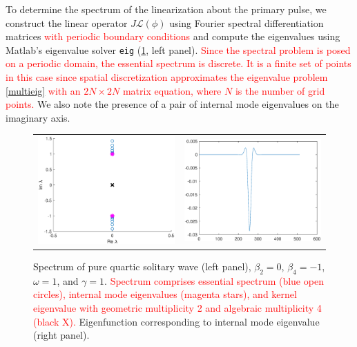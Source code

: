 \documentclass[12pt]{elsarticle}
\def\calL{{\mathcal L}}
\newcommand{\revised}[1]{ \textcolor{red}{#1} }
\begin{document}
To determine the spectrum of the linearization about the primary pulse, we construct the linear operator $J \calL(\phi)$ using Fourier spectral differentiation matrices \revised{with periodic boundary conditions} and compute the eigenvalues using Matlab's eigenvalue solver \texttt{eig} (\cref{fig:PQSspec}, left panel). \revised{Since the spectral problem is posed on a periodic domain, the essential spectrum is discrete. It is a finite set of points in this case since spatial discretization approximates the eigenvalue problem \cref{multieig} with an $2N \times 2N$ matrix equation, where $N$ is the number of grid points.} We also note the presence of a pair of internal mode eigenvalues on the imaginary axis.  

\begin{figure}[H]
\centering
\begin{tabular}{cc}
\includegraphics[width=8cm]{images/PQSspec.eps} &
\includegraphics[width=8cm]{images/PQSinternalmode.eps}
\end{tabular}
\caption{Spectrum of pure quartic solitary wave (left panel), $\beta_2 = 0$, $\beta_4 = -1$, $\omega = 1$, and $\gamma = 1$. \revised{Spectrum comprises essential spectrum (blue open circles), internal mode eigenvalues (magenta stars), and kernel eigenvalue with geometric multiplicity 2 and algebraic multiplicity 4 (black X).} Eigenfunction corresponding to internal mode eigenvalue (right panel).}
\label{fig:PQSspec}
\end{figure} 
\end{document}
